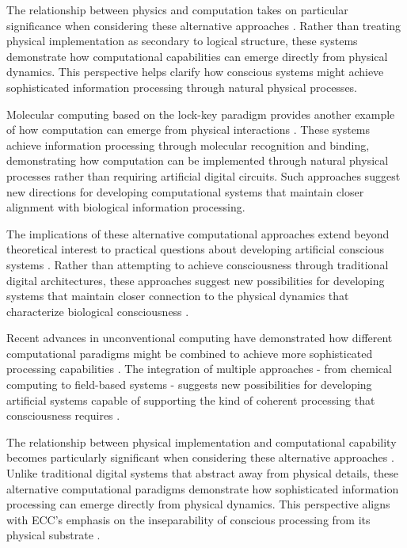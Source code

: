 The relationship between physics and computation takes on particular significance when considering these alternative approaches \cite{Toffoli2019}. Rather than treating physical implementation as secondary to logical structure, these systems demonstrate how computational capabilities can emerge directly from physical dynamics. This perspective helps clarify how conscious systems might achieve sophisticated information processing through natural physical processes.

Molecular computing based on the lock-key paradigm provides another example of how computation can emerge from physical interactions \cite{Zauner2020}. These systems achieve information processing through molecular recognition and binding, demonstrating how computation can be implemented through natural physical processes rather than requiring artificial digital circuits. Such approaches suggest new directions for developing computational systems that maintain closer alignment with biological information processing.

The implications of these alternative computational approaches extend beyond theoretical interest to practical questions about developing artificial conscious systems \cite{Calude2018a}. Rather than attempting to achieve consciousness through traditional digital architectures, these approaches suggest new possibilities for developing systems that maintain closer connection to the physical dynamics that characterize biological consciousness \cite{Deacon2019}.

Recent advances in unconventional computing have demonstrated how different computational paradigms might be combined to achieve more sophisticated processing capabilities \cite{Gorecki2020}. The integration of multiple approaches - from chemical computing to field-based systems - suggests new possibilities for developing artificial systems capable of supporting the kind of coherent processing that consciousness requires \cite{Jaeger2021}.

The relationship between physical implementation and computational capability becomes particularly significant when considering these alternative approaches \cite{Katz2019}. Unlike traditional digital systems that abstract away from physical details, these alternative computational paradigms demonstrate how sophisticated information processing can emerge directly from physical dynamics. This perspective aligns with ECC's emphasis on the inseparability of conscious processing from its physical substrate \cite{Levin2018}.

